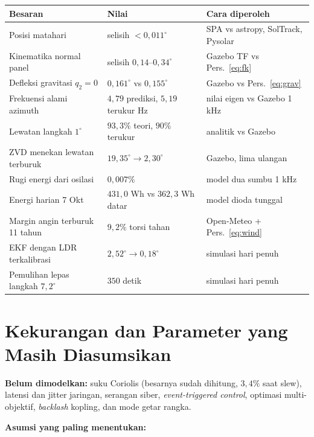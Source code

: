 \documentclass[11pt,a4paper]{article}
\newcommand{\degg}{^\circ}
\begin{document}
\begin{longtable}{p{6.4cm} p{4.6cm} p{4.0cm}}
\toprule
\textbf{Besaran} & \textbf{Nilai} & \textbf{Cara diperoleh} \\
\midrule
\endhead
Posisi matahari & selisih $< 0{,}011\degg$ & SPA vs astropy, SolTrack, Pysolar \\
Kinematika normal panel & selisih $0{,}14$--$0{,}34\degg$ & Gazebo TF vs Pers.~\eqref{eq:fk} \\
Defleksi gravitasi $q_2 = 0$ & $0{,}161\degg$ vs $0{,}155\degg$ & Gazebo vs Pers.~\eqref{eq:grav} \\
Frekuensi alami azimuth & $4{,}79$ prediksi, $5{,}19$ terukur Hz & nilai eigen vs Gazebo 1 kHz \\
Lewatan langkah $1\degg$ & $93{,}3\%$ teori, $90\%$ terukur & analitik vs Gazebo \\
ZVD menekan lewatan terburuk & $19{,}35\degg \rightarrow 2{,}30\degg$ & Gazebo, lima ulangan \\
Rugi energi dari osilasi & $0{,}007\%$ & model dua sumbu 1 kHz \\
Energi harian 7 Okt & $431{,}0$ Wh vs $362{,}3$ Wh datar & model dioda tunggal \\
Margin angin terburuk 11 tahun & $9{,}2\%$ torsi tahan & Open-Meteo + Pers.~\eqref{eq:wind} \\
EKF dengan LDR terkalibrasi & $2{,}52\degg \rightarrow 0{,}18\degg$ & simulasi hari penuh \\
Pemulihan lepas langkah $7{,}2\degg$ & $350$ detik & simulasi hari penuh \\
\bottomrule
\end{longtable}

\section{Kekurangan dan Parameter yang Masih Diasumsikan}
\label{sec:asumsi}

\textbf{Belum dimodelkan:} suku Coriolis (besarnya sudah dihitung, $3{,}4\%$ saat slew), latensi dan jitter
jaringan, serangan siber, \emph{event-triggered control}, optimasi multi-objektif, \emph{backlash} kopling,
dan mode getar rangka.

\textbf{Asumsi yang paling menentukan:}
\end{document}
